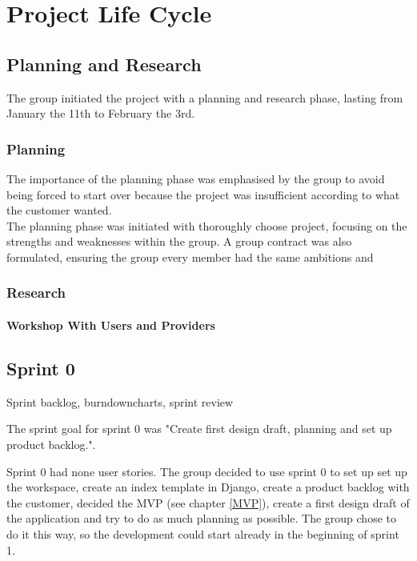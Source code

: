 
\chapter{Project Life Cycle}

\section{Planning and Research}
The group initiated the project with a planning and research phase, lasting from January the 11th to February the 3rd. 

\subsection{Planning}
The importance of the planning phase was emphasised by the group to avoid being forced to start over because the project was insufficient according to what the customer wanted. \\

The planning phase was initiated with thoroughly choose project, focusing on the strengths and weaknesses within the group. A group contract was also formulated, ensuring the group every member had the same ambitions and 


\subsection{Research}
\subsubsection{Workshop With Users and Providers}

\section{Sprint 0}
Sprint backlog, burndowncharts, sprint review

The sprint goal for sprint 0 was "Create first design draft, planning and set up product backlog.". 

Sprint 0 had none user stories. The group decided to use sprint 0 to set up set up the workspace, create an index template in Django, create a product backlog with the customer, decided the MVP (see chapter \ref{MVP}), create a first design draft of the application and try to do as much planning as possible. The group chose to do it this way, so the development could start already in the beginning of sprint 1. 


